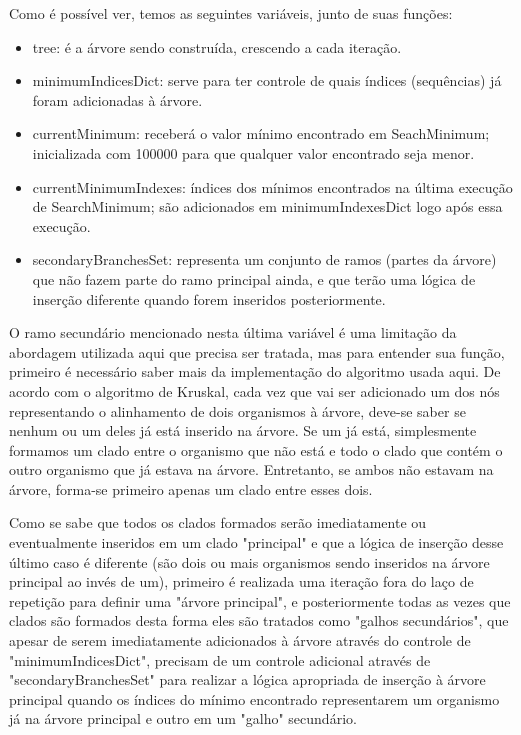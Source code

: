 \documentclass[brazilian,12pt,a4paper,final]{article}
\begin{document}
	Como é possível ver, temos as seguintes variáveis, junto de suas funções:
	\begin{itemize}
		\item tree: é a árvore sendo construída, crescendo a cada iteração. 
		\item minimumIndicesDict: serve para ter controle de quais índices (sequências) já foram adicionadas 
		à árvore.
		\item currentMinimum: receberá o valor mínimo encontrado em SeachMinimum; inicializada com 100000 para que qualquer valor encontrado seja menor.
		\item currentMinimumIndexes: índices dos mínimos encontrados na última execução de SearchMinimum; são adicionados em minimumIndexesDict logo após essa execução.
		\item secondaryBranchesSet: representa um conjunto de ramos (partes da árvore) que não fazem parte do ramo principal ainda, e que terão uma lógica de inserção diferente quando forem inseridos posteriormente.
	\end{itemize}
		
	O ramo secundário mencionado nesta última variável é uma limitação da abordagem utilizada aqui que precisa ser tratada, mas para entender sua função, primeiro é necessário saber mais da implementação do algoritmo usada aqui. De acordo com o algoritmo de Kruskal, cada vez que vai ser adicionado um dos nós representando o alinhamento de dois organismos à árvore, deve-se saber se nenhum ou um deles já está inserido na árvore. Se um já está, simplesmente formamos um clado entre o organismo que não está e todo o clado que contém o outro organismo que já estava na árvore. Entretanto, se ambos não estavam na árvore, forma-se primeiro apenas um clado entre esses dois.
	\vspace{0.5cm}
	
	 Como se sabe que todos os clados formados serão imediatamente ou eventualmente inseridos em um clado "principal" e que a lógica de inserção  desse último caso é diferente (são dois ou mais organismos sendo inseridos na árvore principal ao invés de um), primeiro é realizada uma iteração fora do laço de repetição para definir uma "árvore principal", e posteriormente todas as vezes que clados são formados desta forma eles são tratados como "galhos secundários", que apesar de serem imediatamente adicionados à árvore através do controle de "minimumIndicesDict", precisam de um controle adicional através de "secondaryBranchesSet" para realizar a lógica apropriada de inserção à árvore principal quando os índices do mínimo encontrado representarem um organismo já na árvore principal e outro em um "galho" secundário.
	 \vspace{0.5cm}
	 
\end{document}
